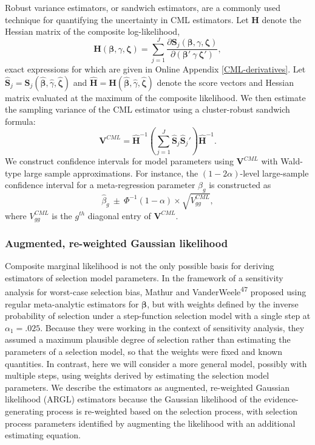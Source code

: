 \documentclass[
  american,
  man, donotrepeattitle,floatsintext]{apa7}
\begin{document}
Robust variance estimators, or sandwich estimators, are a commonly used technique for quantifying the uncertainty in CML estimators. Let \(\mathbf{H}\) denote the Hessian matrix of the composite log-likelihood,
\begin{equation}
\mathbf{H}(\boldsymbol\beta, \gamma, \boldsymbol\zeta) = \sum_{j=1}^J \frac{\partial \mathbf{S}_j(\boldsymbol\beta, \gamma, \boldsymbol\zeta)}{\partial \left(\boldsymbol\beta' \ \gamma \ \boldsymbol\zeta'\right)},
\end{equation}
exact expressions for which are given in Online Appendix \ref{CML-derivatives}.
Let \(\mathbf{\hat{S}}_j = \mathbf{S}_j(\boldsymbol{\hat\beta}, \hat\gamma, \boldsymbol{\hat\zeta})\) and \(\mathbf{\hat{H}} = \mathbf{H}(\boldsymbol{\hat\beta}, \hat\gamma, \boldsymbol{\hat\zeta})\) denote the score vectors and Hessian matrix evaluated at the maximum of the composite likelihood.
We then estimate the sampling variance of the CML estimator using a cluster-robust sandwich formula:
\begin{equation}
\label{eq:sandwich-variance}
\mathbf{V}^{CML} = \mathbf{\hat{H}}^{-1}\left(\sum_{j=1}^J \mathbf{\hat{S}}_j {\mathbf{\hat{S}}_j}'\right) \mathbf{\hat{H}}^{-1}.
\end{equation}
We construct confidence intervals for model parameters using \(\mathbf{V}^{CML}\) with Wald-type large sample approximations. For instance, the \((1 - 2\alpha)\)-level large-sample confidence interval for a meta-regression parameter \(\beta_g\) is constructed as
\[
\hat\beta_g \ \pm \ \Phi^{-1}(1 - \alpha) \times \sqrt{V^{CML}_{gg}},
\]
where \(V^{CML}_{gg}\) is the \(g^{th}\) diagonal entry of \(\mathbf{V}^{CML}\).

\subsubsection{Augmented, re-weighted Gaussian likelihood}\label{augmented-re-weighted-gaussian-likelihood}

Composite marginal likelihood is not the only possible basis for deriving estimators of selection model parameters.
In the framework of a sensitivity analysis for worst-case selection bias, Mathur and VanderWeele\textsuperscript{47} proposed using regular meta-analytic estimators for \(\boldsymbol\beta\), but with weights defined by the inverse probability of selection under a step-function selection model with a single step at \(\alpha_1 = .025\).
Because they were working in the context of sensitivity analysis, they assumed a maximum plausible degree of selection rather than estimating the parameters of a selection model, so that the weights were fixed and known quantities.
In contrast, here we will consider a more general model, possibly with multiple steps, using weights derived by estimating the selection model parameters.
We describe the estimators as augmented, re-weighted Gaussian likelihood (ARGL) estimators because the Gaussian likelihood of the evidence-generating process is re-weighted based on the selection process, with selection process parameters identified by augmenting the likelihood with an additional estimating equation.
\end{document}
